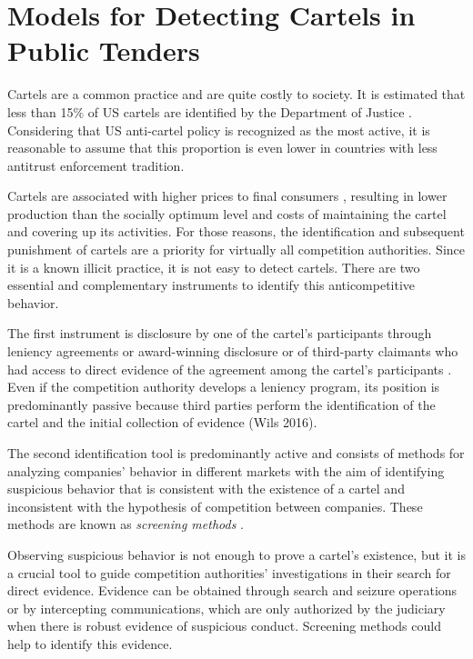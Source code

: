 \vspace{1\baselineskip}
\section{Models for Detecting Cartels in Public Tenders}

Cartels are a common practice and are quite costly to society. It is estimated that less than 15$\%$ of US cartels are identified by the Department of Justice  \cite{bryant1991price}. Considering that US anti-cartel policy is recognized as the most active, it is reasonable to assume that this proportion is even lower in countries with less antitrust enforcement tradition.

 Cartels are associated with higher prices to final consumers  \cite{connor2007price}, resulting in lower production than the socially optimum level and costs of maintaining the cartel and covering up its activities. For those reasons, the identification and subsequent punishment of cartels are a priority for virtually all competition authorities. Since it is a known illicit practice, it is not easy to detect cartels. There are two essential and complementary instruments to identify this anticompetitive behavior.

 The first instrument is disclosure by one of the cartel's participants through leniency agreements or award-winning disclosure or of third-party claimants who had access to direct evidence of the agreement among the cartel's participants  \cite{wils2007leniency}. Even if the competition authority develops a leniency program, its position is predominantly passive because third parties perform the identification of the cartel and the initial collection of evidence (Wils 2016).

 The second identification tool is predominantly active and consists of methods for analyzing companies' behavior in different markets with the aim of identifying suspicious behavior that is consistent with the existence of a cartel and inconsistent with the hypothesis of competition between companies. These methods are known as \textit{screening methods}  \cite{harrington2008detecting}.

 Observing suspicious behavior is not enough to prove a cartel's existence, but it is a crucial tool to guide competition authorities' investigations in their search for direct evidence. Evidence can be obtained through search and seizure operations or by intercepting communications, which are only authorized by the judiciary when there is robust evidence of suspicious conduct. Screening methods could help to identify this evidence.

